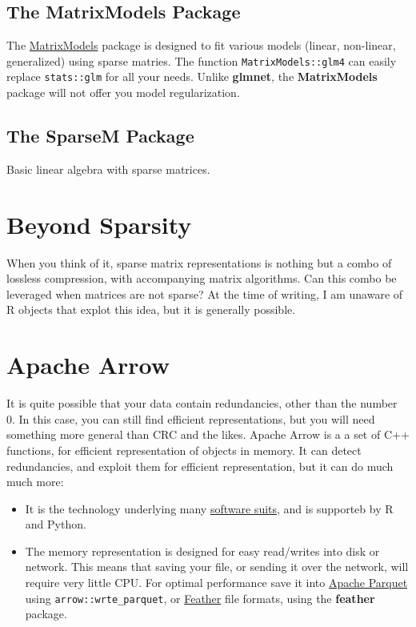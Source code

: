 \documentclass[]{book}
\providecommand{\tightlist}{%
  \setlength{\itemsep}{0pt}\setlength{\parskip}{0pt}}
\theoremstyle{definition}
\theoremstyle{definition}
\theoremstyle{definition}
\theoremstyle{remark}
\begin{document}
\subsection{The MatrixModels Package}\label{the-matrixmodels-package}

The \href{https://cran.r-project.org/package=MatrixModels}{MatrixModels}
package is designed to fit various models (linear, non-linear,
generalized) using sparse matries. The function
\texttt{MatrixModels::glm4} can easily replace \texttt{stats::glm} for
all your needs. Unlike \textbf{glmnet}, the \textbf{MatrixModels}
package will not offer you model regularization.

\subsection{The SparseM Package}\label{the-sparsem-package}

Basic linear algebra with sparse matrices.

\section{Beyond Sparsity}\label{beyond-sparsity}

When you think of it, sparse matrix representations is nothing but a
combo of lossless compression, with accompanying matrix algorithms. Can
this combo be leveraged when matrices are not sparse? At the time of
writing, I am unaware of R objects that explot this idea, but it is
generally possible.

\section{Apache Arrow}\label{apache-arrow}

It is quite possible that your data contain redundancies, other than the
number 0. In this case, you can still find efficient representations,
but you will need something more general than CRC and the likes. Apache
Arrow is a a set of C++ functions, for efficient representation of
objects in memory. It can detect redundancies, and exploit them for
efficient representation, but it can do much much more:

\begin{itemize}
\tightlist
\item
  It is the technology underlying many
  \href{https://arrow.apache.org/powered_by/}{software suits}, and is
  supporteb by R and Python.
\item
  The memory representation is designed for easy read/writes into disk
  or network. This means that saving your file, or sending it over the
  network, will require very little CPU. For optimal performance save it
  into \href{https://en.wikipedia.org/wiki/Apache_Parquet}{Apache
  Parquet} using \texttt{arrow::wrte\_parquet}, or
  \href{https://blog.rstudio.com/2016/03/29/feather/}{Feather} file
  formats, using the \textbf{feather} package.
\end{itemize}
\end{document}
